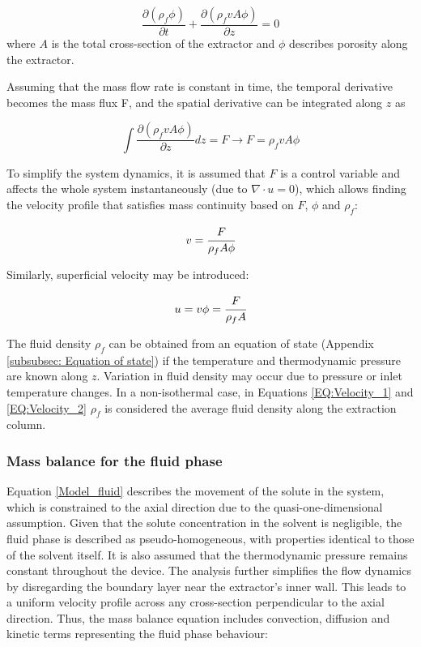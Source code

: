 \documentclass[a4paper,fleqn]{cas-dc}
\begin{document}
{\footnotesize
	\begin{equation} \label{EQ: Continuity_differential}
		\frac{\partial (\rho_f \phi)}{\partial t} + \frac{\partial (\rho_f v A\phi)}{\partial z} = 0
	\end{equation}
}
where $A$ is the total cross-section of the extractor and $\phi$ describes porosity along the extractor.

Assuming that the mass flow rate is constant in time, the temporal derivative becomes the mass flux F, and the spatial derivative can be integrated along $z$ as

{\footnotesize
	\begin{equation}
		\int \frac{\partial (\rho_f v A \phi )}{\partial z} dz = F \rightarrow F=\rho_f v A\phi
	\end{equation}
}

To simplify the system dynamics, it is assumed that $F$ is a control variable and affects the whole system instantaneously (due to $\nabla \cdot u = 0$), which allows finding the velocity profile that satisfies mass continuity based on $F$, $\phi$ and $\rho_f$:

{\footnotesize
	\begin{equation} \label{EQ:Velocity_1}
		v = \cfrac{F}{\rho_f A\phi} 
	\end{equation}
}

Similarly, superficial velocity may be introduced:

{\footnotesize
	\begin{equation} \label{EQ:Velocity_2}
		u = v \phi = \cfrac{F}{\rho_f A }
	\end{equation}
}

The fluid density $\rho_f$ can be obtained from an equation of state (Appendix \ref{subsubsec: Equation of state}) if the temperature and thermodynamic pressure are known along $z$. Variation in fluid density may occur due to pressure or inlet temperature changes. In a non-isothermal case, in Equations \ref{EQ:Velocity_1} and \ref{EQ:Velocity_2} $\rho_f$ is considered the average fluid density along the extraction column.

\subsubsection{Mass balance for the fluid phase} \label{CH: Mass_balance_fluid}

Equation \ref{Model_fluid} describes the movement of the solute in the system, which is constrained to the axial direction due to the quasi-one-dimensional assumption. Given that the solute concentration in the solvent is negligible, the fluid phase is described as pseudo-homogeneous, with properties identical to those of the solvent itself. It is also assumed that the thermodynamic pressure remains constant throughout the device. The analysis further simplifies the flow dynamics by disregarding the boundary layer near the extractor's inner wall. This leads to a uniform velocity profile across any cross-section perpendicular to the axial direction. Thus, the mass balance equation includes convection, diffusion and kinetic terms representing the fluid phase behaviour:
\end{document}
